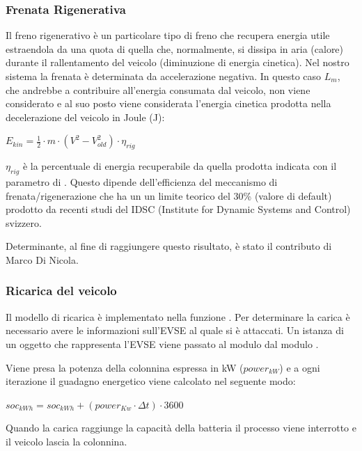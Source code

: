 \subsubsection{Frenata Rigenerativa}

Il freno rigenerativo è un particolare tipo di freno che recupera energia utile estraendola da una quota di quella che, normalmente, si dissipa in aria (calore) durante il rallentamento del veicolo (diminuzione di energia cinetica). Nel nostro sistema la frenata è determinata da accelerazione negativa. In questo caso $L_m$, che andrebbe a contribuire all'energia consumata dal veicolo, non viene considerato e al suo posto viene considerata l'energia cinetica prodotta nella decelerazione del veicolo in Joule (J):

\begin{center}
	$\boxed{E_{kin} = \frac{1}{2} \cdot m \cdot (V^2 - V_{old}^2) \cdot \eta_{rig}}$
\end{center}

$\eta_{rig}$ è la percentuale di energia recuperabile da quella prodotta indicata con il parametro di  . Questo dipende dell'efficienza del meccanismo di frenata/rigenerazione che ha un un limite teorico del 30\% (valore di default)  prodotto da recenti studi del IDSC (Institute for Dynamic Systems and Control) svizzero.

Determinante, al fine di raggiungere questo risultato, è stato il contributo di Marco Di Nicola.

\subsubsection{Ricarica del veicolo}

Il modello di ricarica è implementato nella funzione . Per determinare la carica è necessario avere le informazioni sull'EVSE al quale si è attaccati. Un istanza di un oggetto che rappresenta l'EVSE viene passato al modulo  dal modulo .

Viene presa la potenza della colonnina espressa in kW  ($power_{kW}$) e a ogni iterazione il guadagno energetico viene calcolato nel seguente modo:

\begin{center}
	$\boxed{soc_{kWh} =  soc_{kWh} + (power_{Kw} \cdot \Delta t) \cdot 3600}$
\end{center}

\noindent
Quando la carica raggiunge la capacità della batteria il processo viene interrotto e il veicolo lascia la colonnina.


